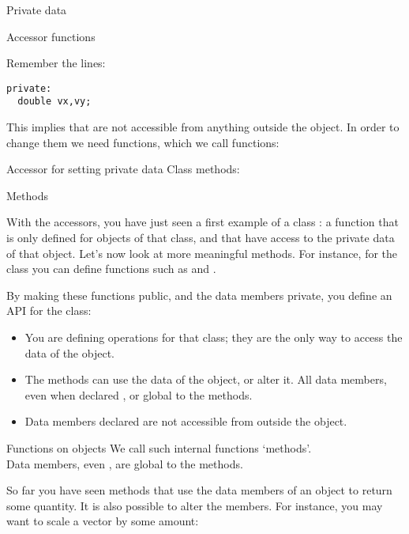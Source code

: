 \begin{block}{Private data}
  \label{sl:class-private}
\end{block}

 {Accessor functions}

Remember the lines:
\begin{verbatim}
private:
  double vx,vy;
\end{verbatim}
This implies that  are not accessible from anything outside
the object. In order to change them we need functions, which we call
 functions:

\begin{block}{Accessor for setting private data}
  \label{sl:class-private-set}
  Class methods:
\end{block}

 {Methods}

With the accessors, you have just seen a first example of a class
: a function that is only defined for objects of
that class, and that have access to the private data of that object.
Let's now look at more meaningful methods. For instance, for the
 class you can define functions such as  and
. 
%

By making these functions public, and the data members
private, you define an \acf{API} for the class:
\begin{itemize}
\item You are defining operations for that class; they are the only
  way to access the data of the object.
\item The methods can use the data of the object, or alter it. All
  data members, even when declared , or global to the methods.
\item  Data members declared  are not accessible from outside the
  object.
\end{itemize}

\begin{slide}{Functions on objects}
  \label{sl:obj-func}
  We call such internal functions `methods'.\\
  Data members, even , are global to the methods.
\end{slide}

So far you have seen methods that use the data members of an object to
return some quantity. It is also possible to alter the members. 
For instance, you may want to scale a vector by some amount:
%

